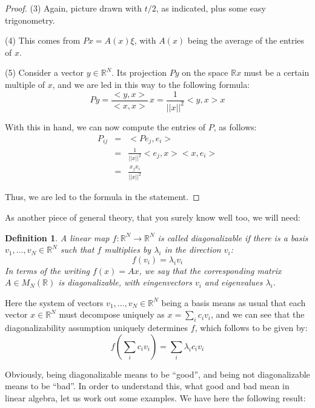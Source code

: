 \documentclass[12pt]{amsbook}
\newtheorem{definition}[theorem]{Definition}
\begin{document}
\begin{proof}
\medskip

(3) Again, picture drawn with $t/2$, as indicated, plus some easy trigonometry.

\medskip

(4) This comes from $Px=A(x)\xi$, with $A(x)$ being the average of the entries of $x$. 

\medskip

(5) Consider a vector $y\in\mathbb R^N$. Its projection $Py$ on the space $\mathbb Rx$ must be a certain multiple of $x$, and we are led in this way to the following formula:
$$Py
=\frac{<y,x>}{<x,x>}\,x
=\frac{1}{||x||^2}<y,x>x$$

With this in hand, we can now compute the entries of $P$, as follows:
\begin{eqnarray*}
P_{ij}
&=&<Pe_j,e_i>\\
&=&\frac{1}{||x||^2}<e_j,x><x,e_i>\\
&=&\frac{x_jx_i}{||x||^2}
\end{eqnarray*}

Thus, we are led to the formula in the statement.
\end{proof}

As another piece of general theory, that you surely know well too, we will need:


\begin{definition}
A linear map $f:\mathbb R^N\to\mathbb R^N$ is called diagonalizable if there is a basis  $v_1,\ldots,v_N\in\mathbb R^N$ such that $f$ multiplies by $\lambda_i$ in the direction $v_i$:
$$f(v_i)=\lambda_iv_i$$
In terms of the writing $f(x)=Ax$, we say that the corresponding matrix $A\in M_N(\mathbb R)$ is diagonalizable, with eingenvectors $v_i$ and eigenvalues $\lambda_i$.
\end{definition}

Here the system of vectors $v_1,\ldots,v_N\in\mathbb R^N$ being a basis means as usual that each vector $x\in\mathbb R^N$ must decompose uniquely as $x=\sum_ic_iv_i$, and we can see that the diagonalizability assumption uniquely determines $f$, which follows to be given by:
$$f\left(\sum_ic_iv_i\right)=\sum_i\lambda_ic_iv_i$$

Obviously, being diagonalizable means to be ``good'', and being not diagonalizable means to be ``bad''. In order to understand this, what good and bad mean in linear algebra, let us work out some examples. We have here the following result:
\end{document}
